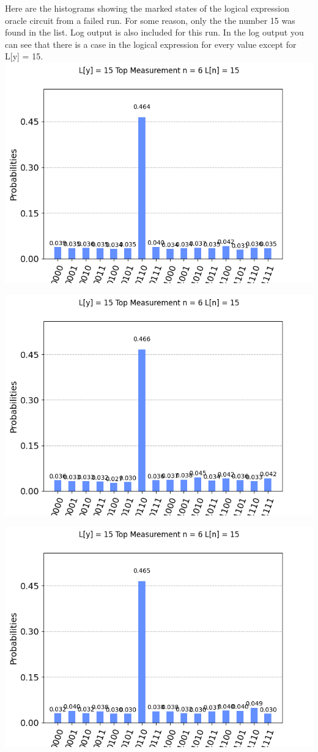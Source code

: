 \documentclass[11pt]{article}
\begin{document}
\newpage
\begin{center}
Here are the histograms showing the marked states of the logical expression oracle circuit from a failed run. For some reason, only the the number 15 was found in the list. Log output is also included for this run. In the log output you can see that there is a case in the logical expression for every value except for L[y] = 15.
\includegraphics[width=\textwidth]{failed_logical_0.png}

\includegraphics[width=\textwidth]{failed_logical_1.png}

\includegraphics[width=\textwidth]{failed_logical_2.png}


\end{center}
\end{document}
